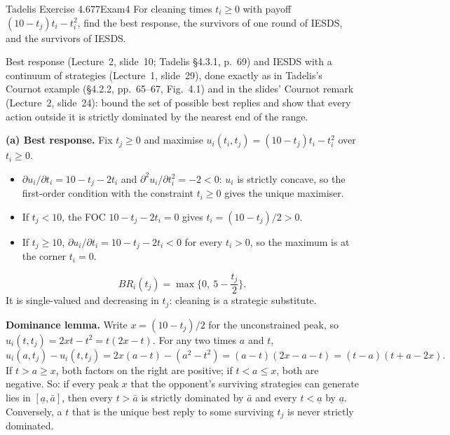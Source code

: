 \begin{exsol}{Tadelis Exercise 4.6}{77}{Exam}{4}
\asked For cleaning times $t_i \ge 0$ with payoff $(10 - t_j)t_i - t_i^2$, find the best response,
the survivors of one round of IESDS, and the survivors of IESDS.

\method Best response (Lecture~2, slide~10; Tadelis \S4.3.1, p.~69) and IESDS with a continuum of
strategies (Lecture~1, slide~29), done exactly as in Tadelis's Cournot example (\S4.2.2,
pp.~65--67, Fig.~4.1) and in the slides' Cournot remark (Lecture~2, slide~24): bound the set of
possible best replies and show that every action outside it is strictly dominated by the nearest
end of the range.

\solution
\textbf{(a) Best response.} Fix $t_j \ge 0$ and maximise $u_i(t_i, t_j) = (10 - t_j)t_i - t_i^2$
over $t_i \ge 0$.
\begin{itemize}
  \item $\partial u_i/\partial t_i = 10 - t_j - 2t_i$ and $\partial^2 u_i/\partial t_i^2 = -2 < 0$:
  $u_i$ is strictly concave, so the first-order condition with the constraint $t_i \ge 0$ gives the
  unique maximiser.
  \item If $t_j < 10$, the FOC $10 - t_j - 2t_i = 0$ gives $t_i = (10 - t_j)/2 > 0$.
  \item If $t_j \ge 10$, $\partial u_i/\partial t_i = 10 - t_j - 2t_i < 0$ for every $t_i > 0$, so
  the maximum is at the corner $t_i = 0$.
\end{itemize}
\[
  BR_i(t_j) = \max\Big\{0,\ 5 - \frac{t_j}{2}\Big\}.
\]
It is single-valued and decreasing in $t_j$: cleaning is a strategic substitute.

\textbf{Dominance lemma.} Write $x = (10 - t_j)/2$ for the unconstrained peak, so
$u_i(t, t_j) = 2xt - t^2 = t(2x - t)$. For any two times $a$ and $t$,
\[
  u_i(a, t_j) - u_i(t, t_j) = 2x(a - t) - (a^2 - t^2) = (a - t)(2x - a - t)
  = (t - a)(t + a - 2x). \tag{1}
\]
If $t > a \ge x$, both factors on the right are positive; if $t < a \le x$, both are negative. So:
if every peak $x$ that the opponent's surviving strategies can generate lies in
$[\underline a, \bar a]$, then every $t > \bar a$ is strictly dominated by $\bar a$ and every
$t < \underline a$ by $\underline a$. Conversely, a $t$ that is the unique best reply to some
surviving $t_j$ is never strictly dominated.


\end{exsol}
